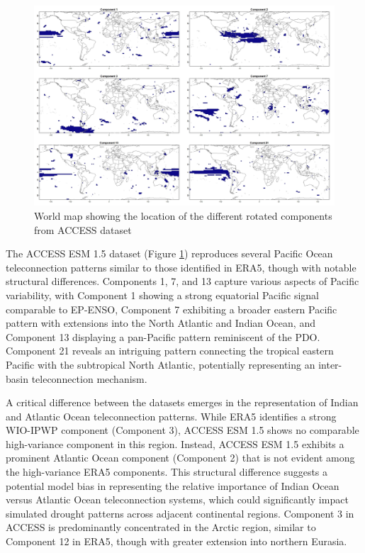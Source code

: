 \documentclass[
]{krantz}
\begin{document}
\begin{figure}

{\centering \includegraphics[width=0.75\linewidth]{work/02-causaldisc/figures/ACCESS/component_mapsaccess} 

}

\caption{World map showing the location of the different rotated components from ACCESS dataset }\label{fig:figure4}
\end{figure}

The ACCESS ESM 1.5 dataset (Figure \ref{fig:figure4}) reproduces several Pacific Ocean teleconnection patterns similar to those identified in ERA5, though with notable structural differences. Components 1, 7, and 13 capture various aspects of Pacific variability, with Component 1 showing a strong equatorial Pacific signal comparable to EP-ENSO, Component 7 exhibiting a broader eastern Pacific pattern with extensions into the North Atlantic and Indian Ocean, and Component 13 displaying a pan-Pacific pattern reminiscent of the PDO. Component 21 reveals an intriguing pattern connecting the tropical eastern Pacific with the subtropical North Atlantic, potentially representing an inter-basin teleconnection mechanism.

A critical difference between the datasets emerges in the representation of Indian and Atlantic Ocean teleconnection patterns. While ERA5 identifies a strong WIO-IPWP component (Component 3), ACCESS ESM 1.5 shows no comparable high-variance component in this region. Instead, ACCESS ESM 1.5 exhibits a prominent Atlantic Ocean component (Component 2) that is not evident among the high-variance ERA5 components. This structural difference suggests a potential model bias in representing the relative importance of Indian Ocean versus Atlantic Ocean teleconnection systems, which could significantly impact simulated drought patterns across adjacent continental regions. Component 3 in ACCESS is predominantly concentrated in the Arctic region, similar to Component 12 in ERA5, though with greater extension into northern Eurasia.
\end{document}
